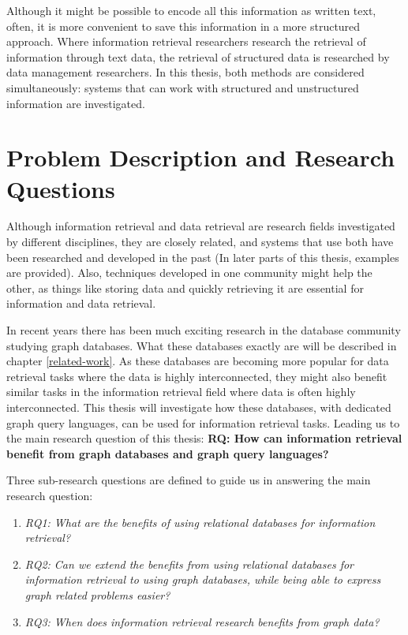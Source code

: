 Although it might be possible to encode all this information as written text, often, it is more convenient to save this information in a more structured approach. Where information retrieval researchers research the retrieval of information through text data, the retrieval of structured data is researched by data management researchers. In this thesis, both methods are considered simultaneously: systems that can work with structured and unstructured information are investigated.

\section{Problem Description and Research Questions}
Although information retrieval and data retrieval are research fields investigated by different disciplines, they are closely related, and systems that use both have been researched and developed in the past (In later parts of this thesis, examples are provided). Also, techniques developed in one community might help the other, as things like storing data and quickly retrieving it are essential for information and data retrieval. 

In recent years there has been much exciting research in the database community studying graph databases. What these databases exactly are will be described in chapter \ref{related-work}. As these databases are becoming more popular for data retrieval tasks where the data is highly interconnected, they might also benefit similar tasks in the information retrieval field where data is often highly interconnected. This thesis will investigate how these databases, with dedicated graph query languages, can be used for information retrieval tasks. Leading us to the main research question of this thesis: \textbf{RQ: How can information retrieval benefit from graph databases and graph query languages?}

Three sub-research questions are defined to guide us in answering the main research question:

\begin{enumerate}
	\item \emph{RQ1: What are the benefits of using relational databases for information retrieval?} 
	\item \emph{RQ2: Can we extend the benefits from using relational databases for information retrieval to using graph databases, while being able to express graph related problems easier?} 
	\item \emph{RQ3: When does information retrieval research benefits from graph data?} 
\end{enumerate}

